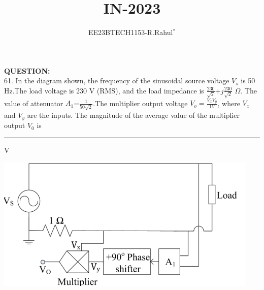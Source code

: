 \documentclass[journal,12pt,twocolumn]{IEEEtran}
\theoremstyle{remark}
\begin{document}

\vspace{3cm}
\title{\textbf{IN-2023}}
\author{EE23BTECH1153-R.Rahul$^{*}$%
}
\maketitle
\newpage
\bigskip

\textbf{QUESTION:}\\
61. In the diagram shown, the frequency of the sinusoidal source voltage $V_s$ is 50 Hz.The load voltage is 230 V (RMS), and the load impedance is $\frac{230}{\sqrt{2}}$+$j\frac{230}{\sqrt{2}}$ $\Omega$. The value of attenuator $A_1$=$\frac{1}{50\sqrt{2}}$.The multiplier output voltage $V_o=\frac{V_xV_y}{1V}$, where $V_x$ and $V_y$ are the inputs. The magnitude of the average value of the multiplier output $V_0$ is \hspace{3cm}\rule{5cm}{0.4pt} V

\vspace{2cm}
 \includegraphics[width=0.8\linewidth]{Gate.png} 
\end{document}

